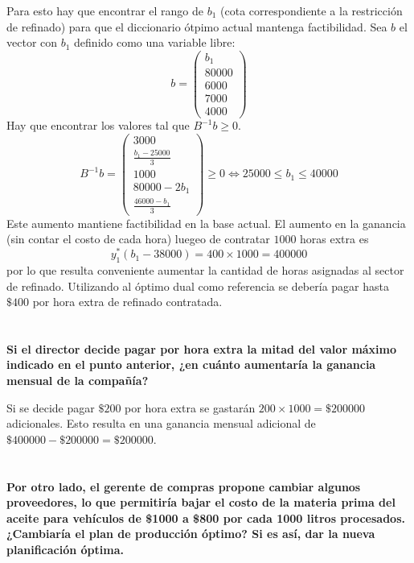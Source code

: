 \documentclass[10pt,a4paper]{article}
\begin{document}
\vspace{5mm}

Para esto hay que encontrar el rango de $b_1$ (cota correspondiente a la restricción de refinado) para que el diccionario ótpimo actual mantenga factibilidad. Sea $b$ el vector con $b_1$ definido como una variable libre:
$$
b = \begin{pmatrix}
	b_1 \\
	80000 \\
	6000 \\
	7000 \\
	4000
\end{pmatrix}
$$
Hay que encontrar los valores tal que $B^{-1}b \geq 0$.
$$
B^{-1}b =
\begin{pmatrix}
	3000 \\
	\frac{b_1 - 25000}{3} \\
	1000 \\
	80000 - 2b_1 \\
	\frac{46000 - b_1}{3}
\end{pmatrix} \geq 0 \iff 25000 \leq b_1 \leq 40000
$$
Este aumento mantiene factibilidad en la base actual. El aumento en la ganancia (sin contar el costo de cada hora) luegeo de contratar $1000$ horas extra es $$y^*_1(b_1 - 38000) = 400 \times 1000 = 400000$$
por lo que resulta conveniente aumentar la cantidad de horas asignadas al sector de refinado. Utilizando al óptimo dual como referencia se debería pagar hasta $\$400$ por hora extra de refinado contratada.
\section{} %
\textbf{Si el director decide pagar por hora extra la mitad del valor máximo indicado en el punto anterior, ¿en cuánto aumentaría la ganancia mensual de la compañía?}

\vspace{5mm}

Si se decide pagar $\$200$ por hora extra se gastarán $200 \times 1000 = \$200000$ adicionales. Esto resulta en una ganancia mensual adicional de $\$400000 - \$200000 = \$200000$.

\section{} %
\textbf{Por otro lado, el gerente de compras propone cambiar algunos proveedores, lo que permitiría bajar el costo de la materia prima del aceite para vehículos de \$1000 a \$800 por cada 1000 litros procesados. ¿Cambiaría el plan de producción óptimo? Si es así, dar la nueva planificación óptima.}
\end{document}
